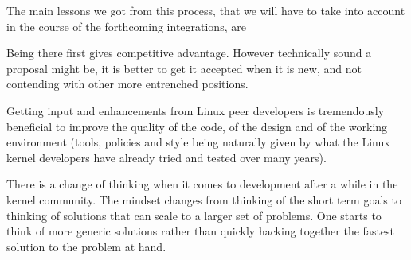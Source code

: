 \documentclass{JAC2003}
\begin{document}
The main lessons we got from this process, that we will have to take into
account in the course of the forthcoming integrations, are
\begin{Itemize}
\item Being there first gives competitive advantage. However technically
    sound a proposal might be, it is better to get it accepted when it is new,
    and not contending with other more entrenched positions.
\item Getting input and enhancements from Linux peer developers
    is tremendously beneficial to improve the quality of the code, of the
    design and of the working environment (tools, policies and style being
    naturally given by what the Linux kernel developers have already tried
    and tested over many years).
\item
    There is a change of thinking when it comes to development after a while
    in the kernel community. The mindset changes from thinking of the short
    term goals to thinking of solutions that can scale to a larger set of
    problems. One starts to think of more generic solutions rather than
    quickly hacking together the fastest solution to the problem at hand.
\end{Itemize}
\end{document}
